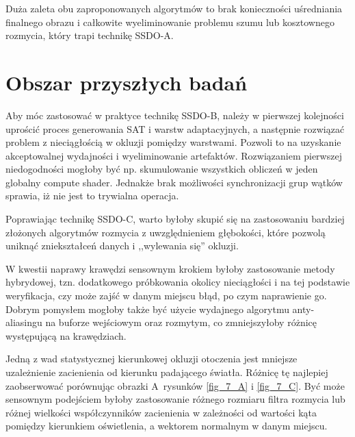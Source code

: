 	Duża zaleta obu zaproponowanych algorytmów to brak konieczności uśredniania finalnego obrazu i całkowite wyeliminowanie problemu szumu lub kosztownego rozmycia, który trapi technikę SSDO-A.
	
	\section{Obszar przyszłych badań}
	\label{t:wnioski:przyszle}
	
	
	Aby móc zastosować w praktyce technikę SSDO-B, należy w pierwszej kolejności uprościć proces generowania SAT i warstw adaptacyjnych, a następnie rozwiązać problem z nieciągłością w okluzji pomiędzy warstwami. Pozwoli to na uzyskanie akceptowalnej wydajności i wyeliminowanie artefaktów. Rozwiązaniem pierwszej niedogodności mogłoby być np. skumulowanie wszystkich obliczeń w jeden globalny compute shader. Jednakże brak możliwości synchronizacji grup wątków sprawia, iż nie jest to trywialna operacja.
	
	Poprawiając technikę SSDO-C, warto byłoby skupić się na zastosowaniu bardziej złożonych algorytmów rozmycia z uwzględnieniem głębokości, które pozwolą uniknąć zniekształceń danych i ,,wylewania się'' okluzji.
	
	W kwestii naprawy krawędzi sensownym krokiem byłoby zastosowanie metody hybrydowej, tzn. dodatkowego próbkowania okolicy nieciągłości i na tej podstawie weryfikacja, czy może zajść w danym miejscu błąd, po czym naprawienie go. Dobrym pomysłem mogłoby także być użycie wydajnego algorytmu anty-aliasingu na buforze wejściowym oraz rozmytym, co zmniejszyłoby różnicę występującą na krawędziach.
	
	Jedną z wad statystycznej kierunkowej okluzji otoczenia jest mniejsze uzależnienie zacienienia od kierunku padającego światła. Różnicę tę najlepiej zaobserwować porównując obrazki A~rysunków \ref{fig_7_A} i \ref{fig_7_C}. Być może sensownym podejściem byłoby zastosowanie różnego rozmiaru filtra rozmycia lub różnej wielkości współczynników zacienienia w zależności od wartości kąta pomiędzy kierunkiem oświetlenia, a wektorem normalnym w danym miejscu.